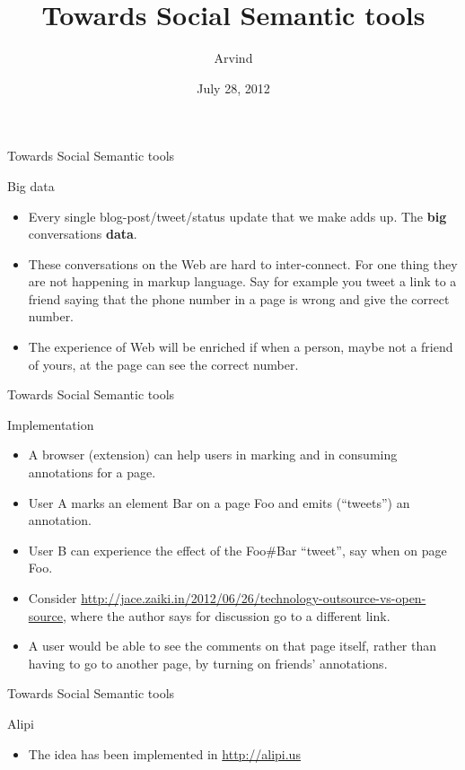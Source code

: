 \documentclass[''urlcolor=red'']{beamer}
\title{Towards Social Semantic tools}
\author{Arvind}
\date{July 28, 2012}
\begin{document}
\begin{frame}
  \titlepage
\end{frame}

\begin{frame}{Towards Social Semantic tools}
  \begin{block}{Big data}
    \begin{itemize}
    \item Every single blog-post/tweet/status update that we make adds up.  The \textbf{big} conversations \textbf{data}.
    \item These conversations on the Web are hard to inter-connect.  For one thing they are not happening in markup language.  Say for example you tweet a link to a friend saying that the phone number in a page is wrong and give the correct number.
    \item The experience of Web will be enriched if when a person, maybe not a friend of yours, at the page can see the correct number.
    \end{itemize}
  \end{block}
\end{frame}

\begin{frame}{Towards Social Semantic tools}
  \begin{block}{Implementation}
    \begin{itemize}
    \item A browser (extension) can help users in marking and in consuming annotations for a page.
    \item User A marks an element Bar on a page Foo and emits (``tweets'') an annotation.
    \item User B can experience the effect of the Foo\#Bar ``tweet'', say when on page Foo.
    \item Consider \url{http://jace.zaiki.in/2012/06/26/technology-outsource-vs-open-source}, where the author says for discussion go to a different link.
    \item A user would be able to see the comments on that page itself, rather than having to go to another page, by turning on friends' annotations.
    \end{itemize}
  \end{block}
\end{frame}

\begin{frame}{Towards Social Semantic tools}
  \begin{block}{Alipi}
    \begin{itemize}
    \item The idea has been implemented in \url{http://alipi.us}
    \end{itemize}
 \end{block}
\end{frame}
\end{document}

